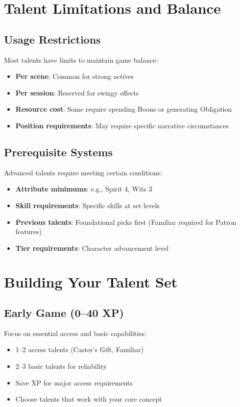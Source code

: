 \section{Talent Limitations and Balance}

\subsection*{Usage Restrictions}
Most talents have limits to maintain game balance:
\begin{itemize}
\item \textbf{Per scene}: Common for strong actives
\item \textbf{Per session}: Reserved for swingy effects
\item \textbf{Resource cost}: Some require spending Boons or generating Obligation
\item \textbf{Position requirements}: May require specific narrative circumstances
\end{itemize}

\subsection*{Prerequisite Systems}
Advanced talents require meeting certain conditions:
\begin{itemize}
\item \textbf{Attribute minimums}: e.g., Spirit 4, Wits 3
\item \textbf{Skill requirements}: Specific skills at set levels
\item \textbf{Previous talents}: Foundational picks first (Familiar required for Patron features)
\item \textbf{Tier requirements}: Character advancement level
\end{itemize}

\section{Building Your Talent Set}

\subsection*{Early Game (0--40 XP)}
Focus on essential access and basic capabilities:
\begin{itemize}
\item 1--2 access talents (Caster's Gift, Familiar)
\item 2--3 basic talents for reliability
\item Save XP for major access requirements
\item Choose talents that work with your core concept
\end{itemize}


